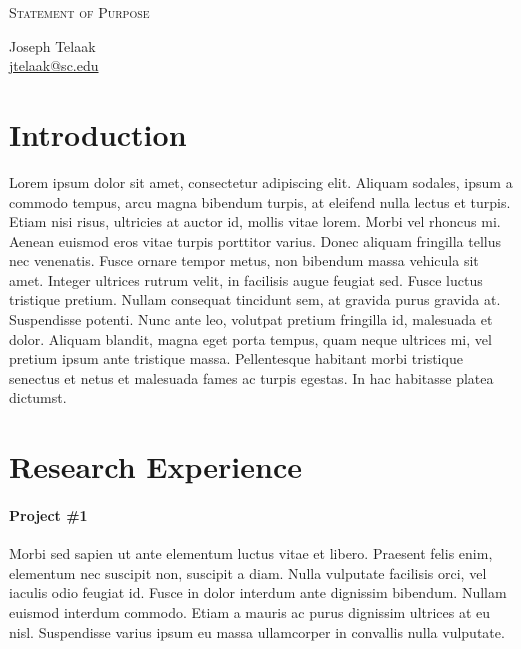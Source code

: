 \documentclass[letterpaper,11pt]{article}
\makeatletter
\newcommand{\soptitle}{Statement of Purpose}
\newcommand{\yourname}{Joseph Telaak}
\newcommand{\youremail}{\href{mailto:jtelaak@sc.edu}{jtelaak@sc.edu}}
\makeatother
\begin{document}
\begin{center}{\huge \scshape \soptitle}\end{center}
\begin{center}\vspace{0.2em} {\Large \yourname\\}
  {\youremail}\end{center}

\section*{Introduction}
Lorem ipsum dolor sit amet, consectetur adipiscing elit. Aliquam
sodales, ipsum a commodo tempus, arcu magna bibendum turpis, at
eleifend nulla lectus et turpis. Etiam nisi risus, ultricies at auctor
id, mollis vitae lorem. Morbi vel rhoncus mi. Aenean euismod eros
vitae turpis porttitor varius. Donec aliquam fringilla tellus nec
venenatis. Fusce ornare tempor metus, non bibendum massa vehicula sit
amet. Integer ultrices rutrum velit, in facilisis augue feugiat sed.
Fusce luctus tristique pretium. Nullam consequat tincidunt sem, at
gravida purus gravida at. Suspendisse potenti. Nunc ante leo, volutpat
pretium fringilla id, malesuada et dolor. Aliquam blandit, magna eget
porta tempus, quam neque ultrices mi, vel pretium ipsum ante tristique
massa. Pellentesque habitant morbi tristique senectus et netus et
malesuada fames ac turpis egestas. In hac habitasse platea dictumst.

\section*{Research Experience}
\paragraph{Project \#1}
Morbi sed sapien ut ante elementum luctus vitae et libero. Praesent
felis enim, elementum nec suscipit non, suscipit a diam. Nulla
vulputate facilisis orci, vel iaculis odio feugiat id. Fusce in dolor
interdum ante dignissim bibendum. Nullam euismod interdum commodo.
Etiam a mauris ac purus dignissim ultrices at eu nisl. Suspendisse
varius ipsum eu massa ullamcorper in convallis nulla vulputate.
\end{document}
